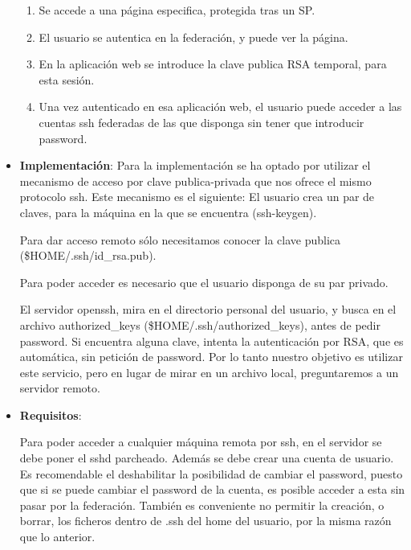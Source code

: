 \begin{itemize}
\begin{enumerate}
        \item Se accede a una página especifica, protegida tras un SP.

        \item El usuario se autentica en la federación, y puede ver la página.

        \item En la aplicación web se introduce la clave publica RSA temporal,
        para esta sesión.

        \item Una vez autenticado en esa aplicación web, el usuario puede
        acceder a las cuentas ssh federadas de las que disponga sin tener que
        introducir password.

    \end{enumerate}

    \item \textbf{Implementación}:
    Para la implementación se ha optado por utilizar el mecanismo de acceso
    por clave publica-privada que nos ofrece el mismo protocolo ssh.
    Este mecanismo es el siguiente:
    El usuario crea un par de claves, para la máquina en la que se
    encuentra (ssh-keygen).

    Para dar acceso remoto sólo necesitamos conocer la clave publica
    (\$HOME/.ssh/id\_rsa.pub).
    
    Para poder acceder es necesario que el usuario disponga de su par
    privado.
    
    El servidor openssh, mira en el directorio personal del usuario, y
    busca en el archivo authorized\_keys (\$HOME/.ssh/authorized\_keys), antes
    de pedir password. Si encuentra alguna clave, intenta la autenticación
    por RSA, que es automática, sin petición de password. Por lo tanto
    nuestro objetivo es utilizar este servicio, pero en lugar de mirar en
    un archivo local, preguntaremos a un servidor remoto.
    
    \item \textbf{Requisitos}:

    Para poder acceder a cualquier máquina remota por ssh, en el servidor
    se debe poner el sshd parcheado. Además se debe crear una cuenta de
    usuario. Es recomendable el deshabilitar la posibilidad de cambiar el
    password, puesto que si se puede cambiar el password de la cuenta, es
    posible acceder a esta sin pasar por la federación. También es
    conveniente no permitir la creación, o borrar, los ficheros dentro de
    .ssh del home del usuario, por la misma razón que lo anterior.


\end{itemize}
